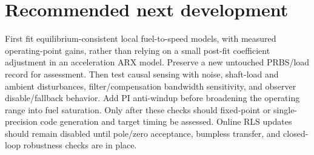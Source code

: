 \section{Recommended next development}

First fit equilibrium-consistent local fuel-to-speed models, with measured
operating-point gains, rather than relying on a small post-fit coefficient
adjustment in an acceleration ARX model. Preserve a new untouched PRBS/load
record for assessment. Then test causal sensing with noise, shaft-load and
ambient disturbances, filter/compensation bandwidth sensitivity, and observer
disable/fallback behavior. Add PI anti-windup before broadening the operating
range into fuel saturation. Only after these checks should fixed-point or
single-precision code generation and target timing be assessed. Online RLS
updates should remain disabled until pole/zero acceptance, bumpless transfer,
and closed-loop robustness checks are in place.
